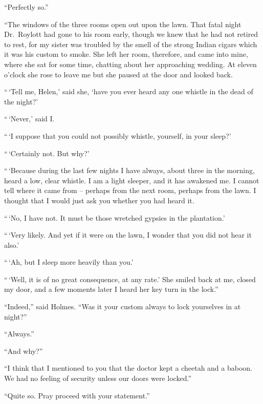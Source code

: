 “Perfectly so.”

“The windows of the three rooms open out upon the lawn.
That fatal night Dr.\ Roylott had gone to his room early,
though we knew that he had not retired to rest, for my sister
was troubled by the smell of the strong Indian cigars which
it was his custom to smoke. She left her room, therefore,
and came into mine, where she sat for some time, chatting
about her approaching wedding. At eleven o’clock she rose
to leave me but she paused at the door and looked back.

“\,‘Tell me, Helen,’ said she, ‘have you ever heard any one
whistle in the dead of the night?’

“\,‘Never,’ said I.

“\,‘I suppose that you could not possibly whistle, yourself,
in your sleep?’

“\,‘Certainly not. But why?’

“\,‘Because during the last few nights I have always, about
three in the morning, heard a low, clear whistle. I am a light
sleeper, and it has awakened me. I cannot tell where it came
from -- perhaps from the next room, perhaps from the lawn. I
thought that I would just ask you whether you had heard it.

“\,‘No, I have not. It must be those wretched gypsies in
the plantation.’

“\,‘Very likely. And yet if it were on the lawn, I wonder
that you did not hear it also.’

“\,‘Ah, but I sleep more heavily than you.’

“\,‘Well, it is of no great consequence, at any rate.’ She
smiled back at me, closed my door, and a few moments later
I heard her key turn in the lock.”

“Indeed,” said Holmes. “Was it your custom always to
lock yourselves in at night?”

“Always.”

“And why?”

“I think that I mentioned to you that the doctor kept a
cheetah and a baboon. We had no feeling of security unless
our doors were locked.”

“Quite so. Pray proceed with your statement.”

